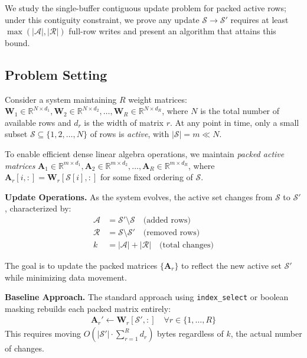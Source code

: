 \documentclass{article}
\numberwithin{equation}{section}
\theoremstyle{plain}
\theoremstyle{definition}
\theoremstyle{remark}
\begin{document}
We study the single-buffer contiguous update problem for packed active rows; under this contiguity constraint, we prove any update $\mathcal{S}\to\mathcal{S}'$ requires at least $\max(|\mathcal{A}|,|\mathcal{R}|)$ full-row writes and present an algorithm that attains this bound.

\subsection{Problem Setting}

Consider a system maintaining $R$ weight matrices: $\mathbf{W}_1 \in \mathbb{R}^{N \times d_1}, \mathbf{W}_2 \in \mathbb{R}^{N \times d_2}, \ldots, \mathbf{W}_R \in \mathbb{R}^{N \times d_R}$, where $N$ is the total number of available rows and $d_r$ is the width of matrix $r$. At any point in time, only a small subset $\mathcal{S} \subseteq \{1, 2, \ldots, N\}$ of rows is \emph{active}, with $|\mathcal{S}| = m \ll N$.

To enable efficient dense linear algebra operations, we maintain \emph{packed active matrices} $\mathbf{A}_1 \in \mathbb{R}^{m \times d_1}, \mathbf{A}_2 \in \mathbb{R}^{m \times d_2}, \ldots, \mathbf{A}_R \in \mathbb{R}^{m \times d_R}$, where $\mathbf{A}_r[i, :] = \mathbf{W}_r[\mathcal{S}[i], :]$ for some fixed ordering of $\mathcal{S}$.

\textbf{Update Operations.} As the system evolves, the active set changes from $\mathcal{S}$ to $\mathcal{S}'$, characterized by:
\begin{align}
\mathcal{A} &= \mathcal{S}' \setminus \mathcal{S} \quad \text{(added rows)} \\
\mathcal{R} &= \mathcal{S} \setminus \mathcal{S}' \quad \text{(removed rows)} \\
k &= |\mathcal{A}| + |\mathcal{R}| \quad \text{(total changes)}
\end{align}

The goal is to update the packed matrices $\{\mathbf{A}_r\}$ to reflect the new active set $\mathcal{S}'$ while minimizing data movement.

\textbf{Baseline Approach.} The standard approach using \texttt{index\_select} or boolean masking rebuilds each packed matrix entirely:
\begin{align}
\mathbf{A}_r' \leftarrow \mathbf{W}_r[\mathcal{S}', :] \quad \forall r \in \{1, \ldots, R\}
\end{align}
This requires moving $O(|\mathcal{S}'| \cdot \sum_{r=1}^R d_r)$ bytes regardless of $k$, the actual number of changes.
\end{document}
